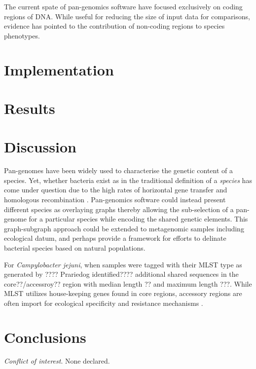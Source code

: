 \documentclass{article}
\begin{document}
The current spate of pan-genomics software have focused exclusively on coding regions of DNA.
While useful for reducing the size of input data for comparisons, evidence \cite{} has pointed to the contribution of non-coding regions to species phenotypes.

\section{Implementation}

\section{Results}

\section{Discussion}

Pan-genomes have been widely used to characterise the genetic content of a species.
Yet, whether bacteria exist as in the traditional definition of a \textit{species} has come under question due to the high rates of horizontal gene transfer and homologous recombination \cite{fraser2009bacterial}.
Pan-genomics software could instead present different species as overlaying graphs thereby allowing the sub-selection of a pan-genome for a particular species while encoding the shared genetic elements.
This graph-subgraph approach could be extended to metagenomic samples including ecological datum, and perhaps provide a framework for efforts \cite{caro2012bacterial} to delinate bacterial species based on natural populations.


For \textit{Campylobacter jejuni}, when samples were tagged with their MLST type as generated by ???? Prariedog identified???? additional shared sequences in the core??/accessroy?? region with median length ?? and maximum length ???. %
While MLST utilizes house-keeping genes found in core regions, accessory regions are often import for ecological specificity and resistance mechanisms \cite{fraser2009bacterial}.

\section{Conclusions}


\textit{Conflict of interest}. None declared.

\newpage



\end{document}
